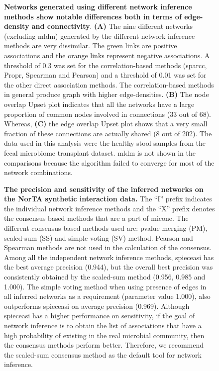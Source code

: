   \begin{figure}[H]
    \centering
    \caption{
      \textbf{Networks generated using different network inference methods show notable differences both in terms of edge-density and connectivity}.
      \textbf{(A)} The nine different networks (excluding \ac{mldm}) generated by the different network inference methods are very dissimilar.
      The green links are positive associations and the orange links represent negative associations.
      A threshold of 0.3 was set for the correlation-based methods (\ac{sparcc}, Propr, Spearman and Pearson) and a threshold of 0.01 was set for the other direct association methods.
      The correlation-based methods in general produce graph with higher edge-densities.
      \textbf{(B)} The node overlap Upset plot indicates that all the networks have a large proportion of common nodes involved in connections (33 out of 68).
      Whereas, \textbf{(C)} the edge overlap Upset plot shows that a very small fraction of these connections are actually shared (8 out of 202).
      The data used in this analysis were the healthy stool samples from the fecal microbiome transplant dataset.
      \ac{mldm} is not shown in the comparisons because the algorithm failed to converge for most of the network combinations.
    }
    \label{fig:figure4}
  \end{figure}

  \begin{figure}[H]
    \centering
    \caption{
      \textbf{The precision and sensitivity of the inferred networks on the NorTA synthetic interaction data.}
      The ``I'' prefix indicates the individual network inference methods and the ``X'' prefix denotes the consensus based methods that are a part of \ac{micone}.
      The different consensus based methods used are: pvalue merging (PM), scaled-sum (SS) and simple voting (SV) method.
      Pearson and Spearman methods are not used in the calculation of the consensus.
      Among all the independent network inference methods, \ac{spieceasi} has the best average precision (0.944), but the overall best precision was consistently obtained by the scaled-sum method (0.956, 0.985 and 1.000).
      The simple voting method when using presence of edges in all inferred networks as a requirement (parameter value 1.000), also outperforms \ac{spieceasi} on average precision (0.969).
      Although \ac{spieceasi} has a higher performance on sensitivity, if the goal of network inference is to obtain the list of associations that have a high probability of existing in the real microbial community, then the consensus methods perform better.
      Therefore, we recommend the scaled-sum consensus method as the default tool for network inference.
    }
    \label{fig:figure5}
  \end{figure}

